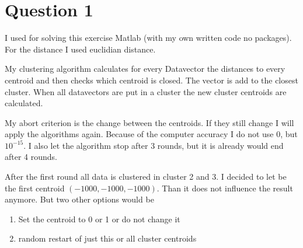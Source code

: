 \section*{Question 1}
I used for solving this exercise Matlab (with my own written code no packages).
For the distance I used euclidian distance.

My clustering algorithm calculates for every Datavector the distances to
every centroid and then checks which centroid is closed. The vector is add to
the closest cluster. When all datavectors are put in a cluster the new cluster
centroids are calculated. 

My abort criterion is the change between the centroids. If they still change I
will apply the algorithms again. Because of the computer accuracy I do not use
0, but $10^{-15}$. I also let the algorithm stop after 3 rounds, but it is
already would end after 4 rounds.

After the first round all data is clustered in cluster 2 and 3. I decided to let
be the first centroid $(-1000,-1000,-1000)$. Than it does not influence the
result anymore. But two other options would be
\begin{enumerate}
  \item Set the centroid to 0 or 1 or do not change it
  \item random restart of just this or all cluster centroids
\end{enumerate}

